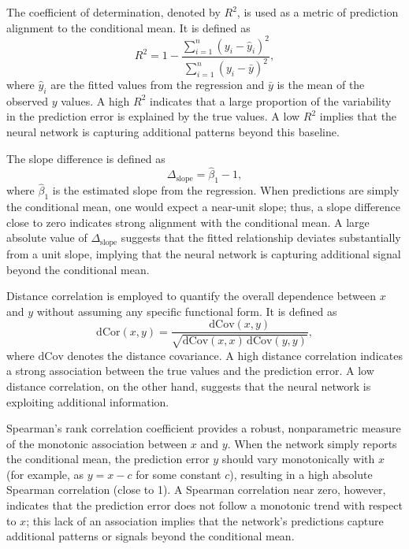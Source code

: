 {The coefficient of determination, denoted by $R^2$, is used as a metric of prediction alignment to the conditional mean. It is defined as
\begin{equation}
R^2 = 1 - \frac{\sum_{i=1}^n (y_i - \hat{y}_i)^2}{\sum_{i=1}^n (y_i - \bar{y})^2},
\end{equation}
where $\hat{y}_i$ are the fitted values from the regression and $\bar{y}$ is the mean of the observed $y$ values. A high $R^2$ indicates that a large proportion of the variability in the prediction error is explained by the true values. A low $R^2$ implies that the neural network is capturing additional patterns beyond this baseline.

The slope difference is defined as
\begin{equation}
\Delta_{\mathrm{slope}} = \hat{\beta}_1 - 1,
\end{equation}
where $\hat{\beta}_1$ is the estimated slope from the regression. When predictions are simply the conditional mean, one would expect a near-unit slope; thus, a slope difference close to zero indicates strong alignment with the conditional mean. A large absolute value of $\Delta_{\mathrm{slope}}$ suggests that the fitted relationship deviates substantially from a unit slope, implying that the neural network is capturing additional signal beyond the conditional mean.

Distance correlation is employed to quantify the overall dependence between $x$ and $y$ without assuming any specific functional form. It is defined as
\begin{equation}
\mathrm{dCor}(x,y) = \frac{\mathrm{dCov}(x,y)}{\sqrt{\mathrm{dCov}(x,x)\,\mathrm{dCov}(y,y)}},
\end{equation}
where $\mathrm{dCov}$ denotes the distance covariance. A high distance correlation indicates a strong association between the true values and the prediction error. A low distance correlation, on the other hand, suggests that the neural network is exploiting additional information.

Spearman's rank correlation coefficient provides a robust, nonparametric measure of the monotonic association between \(x\) and \(y\). When the network simply reports the conditional mean, the prediction error \(y\) should vary monotonically with \(x\) (for example, as \(y = x - c\) for some constant \(c\)), resulting in a high absolute Spearman correlation (close to 1). A Spearman correlation near zero, however, indicates that the prediction error does not follow a monotonic trend with respect to \(x\); this lack of an association implies that the network's predictions capture additional patterns or signals beyond the conditional mean.

}
